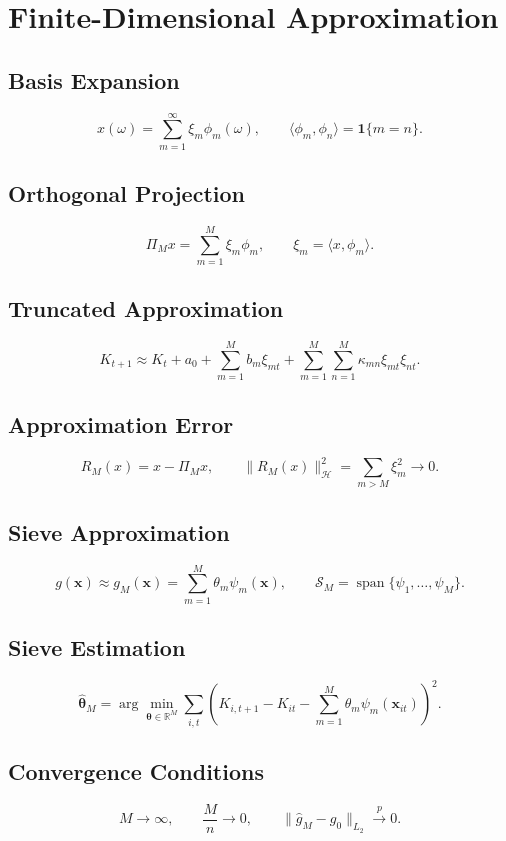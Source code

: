 \documentclass[11pt]{article}
\begin{document}
\section{Finite-Dimensional Approximation}

\subsection{Basis Expansion}
\[
x(\omega)=\sum_{m=1}^{\infty} \xi_m\phi_m(\omega),
\qquad \langle\phi_m,\phi_n\rangle=\mathbf{1}\{m=n\}.
\]

\subsection{Orthogonal Projection}
\[
\Pi_M x=\sum_{m=1}^M\xi_m\phi_m,
\qquad \xi_m=\langle x,\phi_m\rangle.
\]

\subsection{Truncated Approximation}
\[
K_{t+1}\approx K_t+a_0+\sum_{m=1}^M b_m\xi_{mt}+\sum_{m=1}^M\sum_{n=1}^M\kappa_{mn}\xi_{mt}\xi_{nt}.
\]

\subsection{Approximation Error}
\[
R_M(x)=x-\Pi_Mx,
\qquad \|R_M(x)\|_{\mathcal{H}}^2=\sum_{m>M}\xi_m^2\to 0.
\]

\subsection{Sieve Approximation}
\[
g(\bm{x})\approx g_M(\bm{x})=\sum_{m=1}^M \theta_m\psi_m(\bm{x}),
\qquad \mathcal{S}_M=\operatorname{span}\{\psi_1,\dots,\psi_M\}.
\]

\subsection{Sieve Estimation}
\[
\hat{\bm{\theta}}_M=\arg\min_{\bm{\theta}\in\mathbb{R}^M}\sum_{i,t}\left(K_{i,t+1}-K_{it}-\sum_{m=1}^M\theta_m\psi_m(\bm{x}_{it})\right)^2.
\]

\subsection{Convergence Conditions}
\[
M\to\infty,
\qquad \frac{M}{n}\to 0,
\qquad \|\hat g_M-g_0\|_{L_2}\xrightarrow{p}0.
\]
\end{document}
